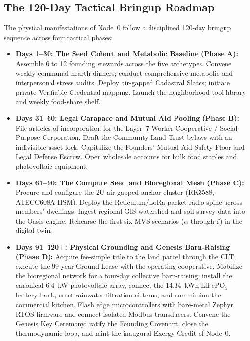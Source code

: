 \subsection{The 120-Day Tactical Bringup Roadmap}
\label{subsec:roadmap_120days}

The physical manifestations of Node~0 follow a disciplined 120-day bringup sequence across four tactical phases:

\begin{itemize}
    \item \textbf{Days 1--30: The Seed Cohort and Metabolic Baseline (Phase A):} Assemble 6 to 12 founding stewards across the five archetypes. Convene weekly communal hearth dinners; conduct comprehensive metabolic and interpersonal stress audits. Deploy air-gapped Cadastral Slates; initiate private Verifiable Credential mapping. Launch the neighborhood tool library and weekly food-share shelf.
    \item \textbf{Days 31--60: Legal Carapace and Mutual Aid Pooling (Phase B):} File articles of incorporation for the Layer~7 Worker Cooperative / Social Purpose Corporation. Draft the Community Land Trust bylaws with an indivisible asset lock. Capitalize the Founders' Mutual Aid Safety Floor and Legal Defense Escrow. Open wholesale accounts for bulk food staples and photovoltaic equipment.
    \item \textbf{Days 61--90: The Compute Seed and Bioregional Mesh (Phase C):} Procure and configure the 2U air-gapped anchor cluster (RK3588, ATECC608A HSM). Deploy the Reticulum/LoRa packet radio spine across members' dwellings. Ingest regional GIS watershed and soil survey data into the Oasis engine. Rehearse the first six MVS scenarios ($\alpha$ through $\zeta$) in the digital twin.
    \item \textbf{Days 91--120+: Physical Grounding and Genesis Barn-Raising (Phase D):} Acquire fee-simple title to the land parcel through the CLT; execute the 99-year Ground Lease with the operating cooperative. Mobilize the bioregional network for a four-day collective barn-raising: install the canonical 6.4~kW photovoltaic array, connect the 14.34~kWh $\mathrm{LiFePO}_4$ battery bank, erect rainwater filtration cisterns, and commission the commercial kitchen. Flash edge microcontrollers with bare-metal Zephyr RTOS firmware and connect isolated Modbus transducers. Convene the Genesis Key Ceremony: ratify the Founding Covenant, close the thermodynamic loop, and mint the inaugural Exergy Credit of Node~0.
\end{itemize}

